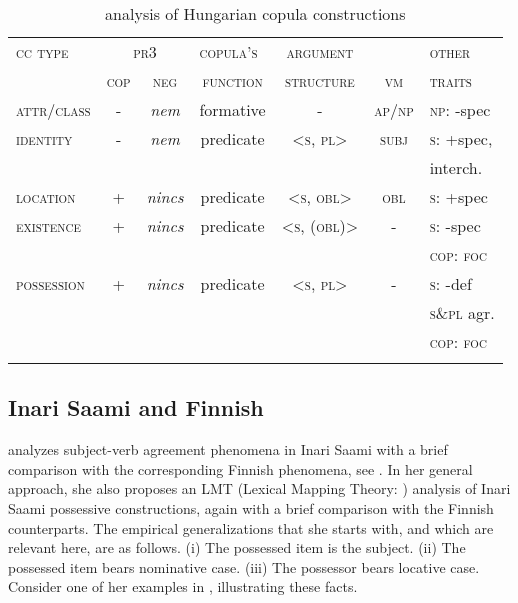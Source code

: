 \documentclass[output=paper,hidelinks]{langscibook}
\begin{document}
\begin{table}[t]
\begin{tabularx}{\textwidth}{lcccccl}
\lsptoprule
    {\textsc{cc} \textsc{type}} & \multicolumn{2}{c}{\textsc{pr3}}  & {\textsc{copula's~}}  & {\textsc{argument}} &  & {\textsc{other}}\\\cmidrule(lr){2-3}
     &  {\textsc{cop}} & {\textsc{neg}} &  {\textsc{function}} & {\textsc{structure}} & {\textsc{vm}} & {\textsc{traits}}\\\midrule
\textsc{attr/class} & - & \textit{nem} & formative & - & \textsc{ap/np} & \textsc{np}: -spec\\
\textsc{identity} & - & \textit{nem} & predicate & \textsc{<s,} \textsc{pl>} & \textsc{subj} & \textsc{s}: +spec,\\
& & & & & & interch.\\
\textsc{location} & + & \textit{nincs} & predicate & \textsc{<s,} \textsc{obl>} & \textsc{obl} & \textsc{s}: +spec\\
\textsc{existence} & + & \textit{nincs} & predicate & \textsc{<s,} \textsc{(obl)>} & - & \textsc{s}: -spec \\
& & & & & & \textsc{cop}: \textsc{foc}\\
\textsc{possession} & + & \textit{nincs} & predicate & \textsc{<s,} \textsc{pl>} & - & \textsc{s}: -def\\
& & & & & & \textsc{s\&pl} agr.\\
& & & & & & \textsc{cop}: \textsc{foc}\\
\lspbottomrule
\end{tabularx}
\caption{ analysis of Hungarian copula constructions}
\label{tab:FinnoUgric:3}
\end{table}


    
\subsection{Inari Saami and Finnish}
\label{sec:FinnoUgric:5.2}

\citet{Toivonen2007} analyzes subject-verb agreement phenomena in Inari Saami with a brief comparison with the corresponding Finnish phenomena, see . In her general approach, she also proposes an LMT (Lexical Mapping Theory: ) analysis of Inari Saami possessive constructions, again with a brief comparison with the Finnish counterparts. The empirical generalizations that she starts with, and which are relevant here, are as follows. (i) The possessed item is the subject. (ii) The possessed item bears nominative case. (iii) The possessor bears locative case. Consider one of her examples in , illustrating these facts.
\end{document}
